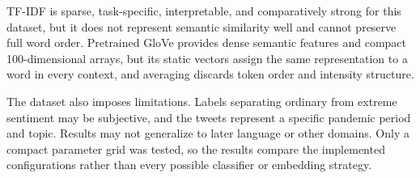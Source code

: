 TF-IDF is sparse, task-specific, interpretable, and comparatively strong for this dataset, 
but it does not represent semantic similarity well and cannot preserve full word order. 
Pretrained GloVe provides dense semantic features and compact 100-dimensional arrays, 
but its static vectors assign the same representation to a word in every context, 
and averaging discards token order and intensity structure.

The dataset also imposes limitations. Labels separating ordinary from extreme sentiment 
may be subjective, and the tweets represent a specific pandemic period and topic. 
Results may not generalize to later language or other domains. Only a compact parameter grid 
was tested, so the results compare the implemented configurations rather than every possible 
classifier or embedding strategy.
